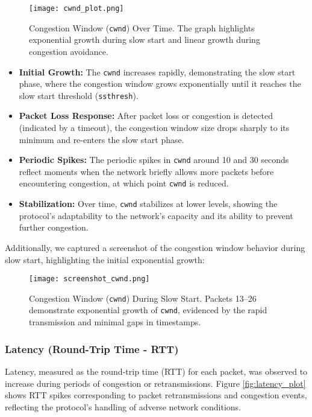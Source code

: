 \documentclass[11pt]{article}
\begin{document}
\begin{figure}[H]
    \centering
    \texttt{[image: cwnd\_plot.png]}
    \caption{Congestion Window (\texttt{cwnd}) Over Time. The graph highlights exponential growth during slow start and linear growth during congestion avoidance.}
    \label{fig:cwnd_plot}
\end{figure}


\begin{itemize}
    \item \textbf{Initial Growth:} The \texttt{cwnd} increases rapidly, demonstrating the slow start phase, where the congestion window grows exponentially until it reaches the slow start threshold (\texttt{ssthresh}).
    \item \textbf{Packet Loss Response:} After packet loss or congestion is detected (indicated by a timeout), the congestion window size drops sharply to its minimum and re-enters the slow start phase.
    \item \textbf{Periodic Spikes:} The periodic spikes in \texttt{cwnd} around 10 and 30 seconds reflect moments when the network briefly allows more packets before encountering congestion, at which point \texttt{cwnd} is reduced.
    \item \textbf{Stabilization:} Over time, \texttt{cwnd} stabilizes at lower levels, showing the protocol's adaptability to the network's capacity and its ability to prevent further congestion.
\end{itemize}

Additionally, we captured a screenshot of the congestion window behavior during slow start, highlighting the initial exponential growth:

\begin{figure}[H]
    \centering
    \texttt{[image: screenshot\_cwnd.png]}
    \caption{Congestion Window (\texttt{cwnd}) During Slow Start. Packets 13–26 demonstrate exponential growth of \texttt{cwnd}, evidenced by the rapid transmission and minimal gaps in timestamps.}
    \label{fig:cwnd_slow_start}
\end{figure}

\subsubsection{Latency (Round-Trip Time - RTT)}

Latency, measured as the round-trip time (RTT) for each packet, was observed to increase during periods of congestion or retransmissions. Figure \ref{fig:latency_plot} shows RTT spikes corresponding to packet retransmissions and congestion events, reflecting the protocol's handling of adverse network conditions.
\end{document}
